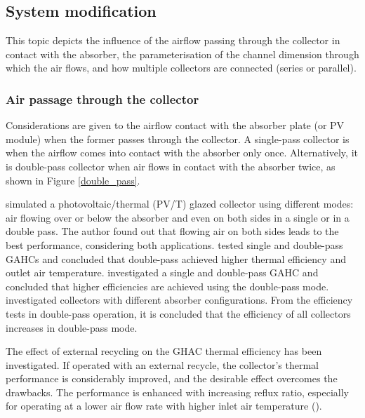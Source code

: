\subsection{System modification}

This topic depicts the influence of the airflow passing through the collector in contact with the absorber, the parameterisation of the channel dimension through which the air flows, and how multiple collectors are connected (series or parallel).

\subsubsection{Air passage through the collector}

Considerations are given to the airflow contact with the absorber plate (or PV module) when the former passes through the collector. A single-pass collector is when the airflow comes into contact with the absorber only once. Alternatively, it is double-pass collector when air flows in contact with the absorber twice, as shown in Figure \ref{double_pass}. 


\citet{Hegazy2000} simulated a photovoltaic/thermal (PV/T) glazed collector using different modes: air flowing over or below the absorber and even on both sides in a single or in a double pass. The author found out that flowing air on both sides leads to the best performance, considering both applications. \citet{Yousef2008} tested single and double-pass GAHCs and concluded that double-pass achieved higher thermal efficiency and outlet air temperature. \citet{Nowzari2015} investigated a single and double-pass GAHC and concluded that higher efficiencies are achieved using the double-pass mode. \citet{Karim2004} investigated collectors with different absorber configurations. From the efficiency tests in double-pass operation, it is concluded that the efficiency of all collectors increases in double-pass mode.

The effect of external recycling on the GHAC thermal efficiency has been investigated. If operated with an external recycle, the collector's thermal performance is considerably improved, and the desirable effect overcomes the drawbacks. The performance is enhanced with increasing reflux ratio, especially for operating at a lower air flow rate with higher inlet air temperature (\cite{Yeh2009}).

